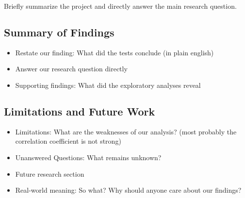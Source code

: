 \documentclass[
  american,
  11pt,
  letterpaper,
]{article}
\providecommand{\tightlist}{%
  \setlength{\itemsep}{0pt}\setlength{\parskip}{0pt}}
\begin{document}
Briefly summarize the project and directly answer the main research
question.

\subsection{Summary of Findings}\label{summary-of-findings}

\begin{itemize}
\tightlist
\item
  Restate our finding: What did the tests conclude (in plain english)
\item
  Answer our research question directly
\item
  Supporting findings: What did the exploratory analyses reveal
\end{itemize}

\subsection{Limitations and Future
Work}\label{limitations-and-future-work}

\begin{itemize}
\tightlist
\item
  Limitations: What are the weaknesses of our analysis? (most probably
  the correlation coefficient is not strong)
\item
  Unanswered Questions: What remains unknown?
\item
  Future research section
\item
  Real-world meaning: So what? Why should anyone care about our
  findings?
\end{itemize}
\end{document}
